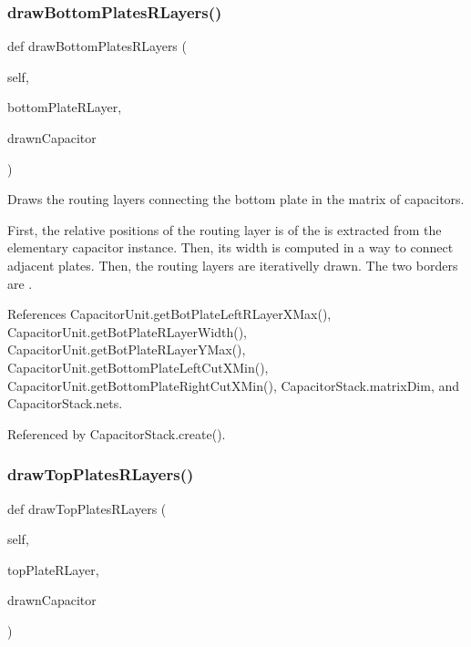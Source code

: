 \subsubsection{\texorpdfstring{draw\+Bottom\+Plates\+R\+Layers()}{drawBottomPlatesRLayers()}}
{\footnotesize\ttfamily def draw\+Bottom\+Plates\+R\+Layers (\begin{DoxyParamCaption}\item[{}]{self,  }\item[{}]{bottom\+Plate\+R\+Layer,  }\item[{}]{drawn\+Capacitor }\end{DoxyParamCaption})}



Draws the routing layers connecting the bottom plate in the matrix of capacitors. 

First, the relative positions of the routing layer is of the is extracted from the elementary capacitor instance. Then, its width is computed in a way to connect adjacent plates. Then, the routing layers are iterativelly drawn. The two borders are . 

References Capacitor\+Unit.\+get\+Bot\+Plate\+Left\+R\+Layer\+X\+Max(), Capacitor\+Unit.\+get\+Bot\+Plate\+R\+Layer\+Width(), Capacitor\+Unit.\+get\+Bot\+Plate\+R\+Layer\+Y\+Max(), Capacitor\+Unit.\+get\+Bottom\+Plate\+Left\+Cut\+X\+Min(), Capacitor\+Unit.\+get\+Bottom\+Plate\+Right\+Cut\+X\+Min(), Capacitor\+Stack.\+matrix\+Dim, and Capacitor\+Stack.\+nets.



Referenced by Capacitor\+Stack.\+create().

\mbox{\label{classpython_1_1capacitormatrix_1_1CapacitorStack_ac4f954eb981ca22afd05d15d24054c78}} 
\subsubsection{\texorpdfstring{draw\+Top\+Plates\+R\+Layers()}{drawTopPlatesRLayers()}}
{\footnotesize\ttfamily def draw\+Top\+Plates\+R\+Layers (\begin{DoxyParamCaption}\item[{}]{self,  }\item[{}]{top\+Plate\+R\+Layer,  }\item[{}]{drawn\+Capacitor }\end{DoxyParamCaption})}



